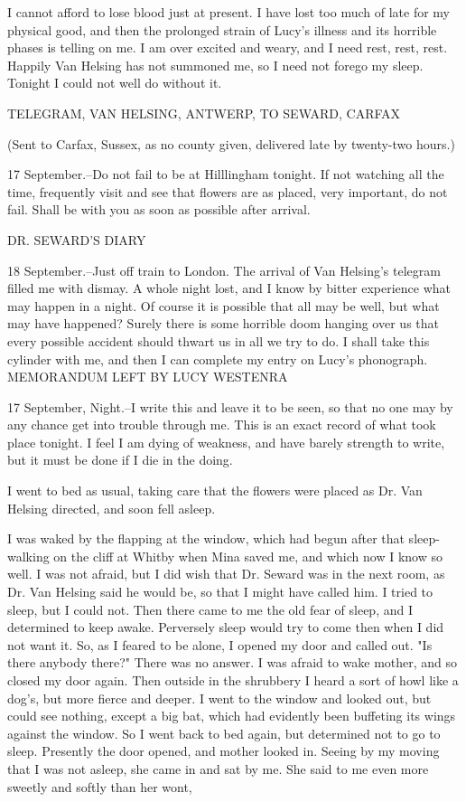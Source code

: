 I cannot afford to lose blood just at present. I have lost too much of late for my physical good, and then the prolonged strain of Lucy's illness and its horrible phases is telling on me. I am over excited and weary, and I need rest, rest, rest. Happily Van Helsing has not summoned me, so I need not forego my sleep. Tonight I could not well do without it. 

TELEGRAM, VAN HELSING, ANTWERP, TO SEWARD, CARFAX 

(Sent to Carfax, Sussex, as no county given, delivered late by twenty-two hours.) 

17 September.--Do not fail to be at Hilllingham tonight. If not watching all the time, frequently visit and see that flowers are as placed, very important, do not fail. Shall be with you as soon as possible after arrival. 

DR. SEWARD'S DIARY 

18 September.--Just off train to London. The arrival of Van Helsing's telegram filled me with dismay. A whole night lost, and I know by bitter experience what may happen in a night. Of course it is possible that all may be well, but what may have happened? Surely there is some horrible doom hanging over us that every possible accident should thwart us in all we try to do. I shall take this cylinder with me, and then I can complete my entry on Lucy's phonograph. MEMORANDUM LEFT BY LUCY WESTENRA 

17 September, Night.--I write this and leave it to be seen, so that no one may by any chance get into trouble through me. This is an exact record of what took place tonight. I feel I am dying of weakness, and have barely strength to write, but it must be done if I die in the doing. 

I went to bed as usual, taking care that the flowers were placed as Dr. Van Helsing directed, and soon fell asleep. 

I was waked by the flapping at the window, which had begun after that sleep-walking on the cliff at Whitby when Mina saved me, and which now I know so well. I was not afraid, but I did wish that Dr. Seward was in the next room, as Dr. Van Helsing said he would be, so that I might have called him. I tried to sleep, but I could not. Then there came to me the old fear of sleep, and I determined to keep awake. Perversely sleep would try to come then when I did not want it. So, as I feared to be alone, I opened my door and called out. "Is there anybody there?" There was no answer. I was afraid to wake mother, and so closed my door again. Then outside in the shrubbery I heard a sort of howl like a dog's, but more fierce and deeper. I went to the window and looked out, but could see nothing, except a big bat, which had evidently been buffeting its wings against the window. So I went back to bed again, but determined not to go to sleep. Presently the door opened, and mother looked in. Seeing by my moving that I was not asleep, she came in and sat by me. She said to me even more sweetly and softly than her wont, 

